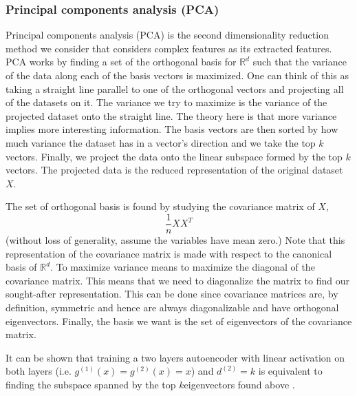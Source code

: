 \documentclass{article}
\begin{document}
\subsubsection{Principal components analysis (PCA)}
Principal components analysis (PCA) is the second dimensionality reduction method we consider that considers complex features as its extracted features. PCA works by finding a set of the orthogonal basis for $\mathbb{R}^d$ such that the variance of the data along each of the basis vectors is maximized. One can think of this as taking a straight line parallel to one of the orthogonal vectors and projecting all of the datasets on it. The variance we try to maximize is the variance of the projected dataset onto the straight line. The theory here is that more variance implies more interesting information. The basis vectors are then sorted by how much variance the dataset has in a vector's direction and we take the top $k$ vectors. Finally, we project the data onto the linear subspace formed by the top $k$ vectors. The projected data is the reduced representation of the original dataset $X.$

The set of orthogonal basis is found by studying the covariance matrix of $X$, 
\[
    \frac{1}{n}XX^{T}
\] 
(without loss of generality, assume the variables have mean zero.) Note that this representation of the covariance matrix is made with respect to the canonical basis of $\mathbb{R}^d.$ To maximize variance means to maximize the diagonal of the covariance matrix. This means that we need to diagonalize the matrix to find our sought-after representation. This can be done since covariance matrices are, by definition, symmetric and hence are always diagonalizable and have orthogonal eigenvectors. Finally, the basis we want is the set of eigenvectors of the covariance matrix.

It can be shown that training a two layers autoencoder with linear activation on both layers (i.e. $g^{(1)}(x) = g^{(2)}(x) = x$) and $d^{(2)} = k$ is equivalent to finding the subspace spanned by the top $k$eigenvectors found above \cite{aepca}.
\end{document}
